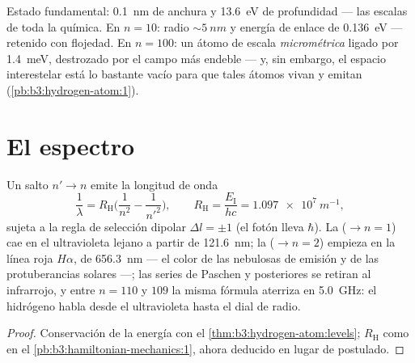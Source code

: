 \begin{example}\label{ex:b3:hydrogen-atom:sizes}
Estado fundamental: \qty{0.1}{nm} de anchura y \qty{13.6}{eV} de
profundidad --- las escalas de toda la química. En $n = 10$: radio
$\sim\qty{5}{nm}$ y energía de enlace de \qty{0.136}{eV} --- retenido con
flojedad. En $n = 100$: un átomo de escala \emph{micrométrica} ligado por
\qty{1.4}{meV}, destrozado por el campo más endeble --- y, sin embargo, el
espacio interestelar está lo bastante vacío para que tales átomos vivan y
emitan (\cref{pb:b3:hydrogen-atom:1}).
\end{example}

\section{El espectro}

\begin{proposition}\label{prop:b3:hydrogen-atom:series}
Un salto $n' \to n$ emite la longitud de onda
\[
\frac{1}{\lambda} = R_{\text{H}}\Big(\frac{1}{n^2} -
\frac{1}{n'^2}\Big) , \qquad
R_{\text{H}} = \frac{E_{\text{I}}}{hc} = \qty{1.097e7}{m^{-1}} ,
\]
sujeta a la regla de selección dipolar $\Delta l = \pm1$ (el fotón
lleva $\hbar$). La  ($\to n = 1$) cae en el ultravioleta
lejano a partir de \qty{121.6}{nm}; la  ($\to n = 2$)
empieza en la línea roja $H\alpha$, de \qty{656.3}{nm} --- el color de las
nebulosas de emisión y de las protuberancias solares ---; las series de
Paschen y posteriores se retiran al infrarrojo, y entre $n = 110$ y $109$
la misma fórmula aterriza en \qty{5.0}{GHz}: el hidrógeno habla desde el
ultravioleta hasta el dial de radio.
\end{proposition}

\begin{proof}
Conservación de la energía con el \cref{thm:b3:hydrogen-atom:levels};
$R_{\text{H}}$ como en el \cref{pb:b3:hamiltonian-mechanics:1}, ahora
deducido en lugar de postulado.
\end{proof}

